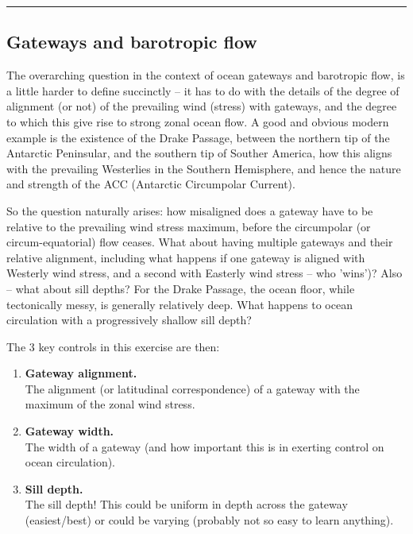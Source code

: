 \vspace{1mm}\noindent\rule{4cm}{0.5pt}\vspace{2mm}

\subsection{Gateways and barotropic flow}

The overarching question in the context of ocean gateways and barotropic flow, is a little harder to define succinctly -- it has to do with the details of the degree of alignment (or not) of the prevailing wind (stress)
with  gateways, and the degree to which this give rise to strong zonal ocean flow. A good and obvious modern example is the existence of the Drake Passage, between the northern tip of the Antarctic Peninsular, and the southern tip of Souther America, how this aligns with the prevailing Westerlies in the Southern Hemisphere, and hence the nature and strength of the ACC (Antarctic Circumpolar Current).

So the question naturally arises: how misaligned does a gateway have to be relative to the prevailing wind stress maximum, before the circumpolar (or circum-equatorial) flow ceases. What about having multiple gateways and their relative alignment, including what happens if one gateway is aligned with Westerly wind stress, and a second with Easterly wind stress -- who 'wins')? Also -- what about sill depths? For the Drake Passage, the ocean floor, while tectonically messy, is generally relatively deep. What happens to ocean circulation with a progressively shallow sill depth?

\noindent The 3 key controls in this exercise are then:
\vspace{1mm}

\begin{enumerate}
\vspace{1mm}
\item \textbf{Gateway alignment.}
\vspace{1mm}
\\The alignment (or latitudinal correspondence) of a gateway with the maximum of the zonal wind stress.
\vspace{1mm}
\item \textbf{Gateway width.}
\vspace{1mm}
\\The width of a gateway (and how important this is in exerting control on ocean circulation).
\vspace{1mm}
\item \textbf{Sill depth.}
\vspace{1mm}
\\The sill depth! This could be uniform in depth across the gateway (easiest/best) or could be varying (probably not so easy to learn anything).
\end{enumerate}
\vspace{2mm}

